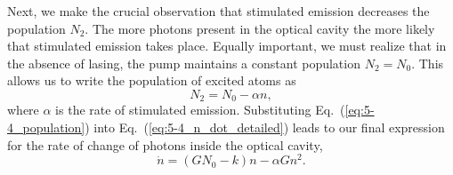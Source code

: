 Next, we make the crucial observation that stimulated emission decreases the population $N_2$.
The more photons present in the optical cavity the more likely that stimulated emission takes place.
Equally important, we must realize that in the absence of lasing, the pump maintains a constant population $N_2 = N_0$.
This allows us to write the population of excited atoms as
\begin{equation}
    N_2 = N_0 - \alpha n,
    \label{eq:5-4_population}
\end{equation}
where $\alpha$ is the rate of stimulated emission.
Substituting Eq.~(\ref{eq:5-4_population}) into Eq.~(\ref{eq:5-4_n_dot_detailed}) leads to our final expression for the rate of change of photons inside the optical cavity,
\begin{equation}
    \dot{n} = (G N_0 - k) n - \alpha G n^2.
    \label{eq:5-4_n_dot_final}
\end{equation}

